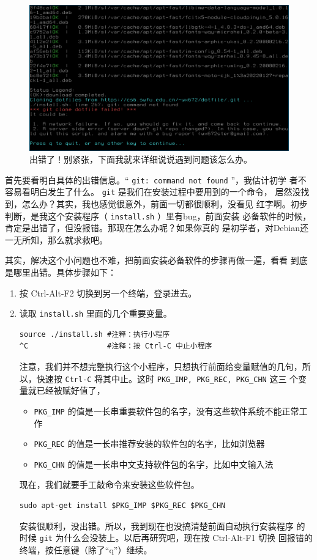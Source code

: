 \documentclass{wx672ctexart} \usepackage{hyperref}
\begin{document}
\begin{enumerate}
\begin{figure}[htbp]
\centering
\includegraphics[width=.5\linewidth]{screenshots/45.png}
\caption{出错了！别紧张，下面我就来详细说说遇到问题该怎么办。}
\end{figure}

首先要看明白具体的出错信息。“ \texttt{git: command not found} ”，我估计初学
者不容易看明白发生了什么。 \texttt{git} 是我们在安装过程中要用到的一个命令，
居然没找到，怎么办？其实，我也感觉很意外，前面一切都很顺利，没看见
红字啊。初步判断，是我这个安装程序（ \texttt{install.sh} ）里有bug，前面安装
必备软件的时候，肯定是出错了，但没报错。那现在怎么办呢？如果你真的
是初学者，对Debian还一无所知，那么就求救吧。

其实，解决这个小问题也不难，把前面安装必备软件的步骤再做一遍，看看
到底是哪里出错。具体步骤如下：

\begin{enumerate}
\item 按 Ctrl-Alt-F2 切换到另一个终端，登录进去。
\item 读取 \texttt{install.sh} 里面的几个重要变量。
\begin{verbatim}
source ./install.sh #注释：执行小程序
^C                  #注释：按 Ctrl-C 中止小程序
\end{verbatim}
注意，我们并不想完整执行这个小程序，只想执行前面给变量赋值的几句，所
以，快速按 \texttt{Ctrl-C} 将其中止。这时 \texttt{PKG\_IMP, PKG\_REC, PKG\_CHN} 这三
个变量就已经被赋好值了，
\begin{itemize}
\item \texttt{PKG\_IMP} 的值是一长串重要软件包的名字，没有这些软件系统不能正常工作
\item \texttt{PKG\_REC} 的值是一长串推荐安装的软件包的名字，比如浏览器
\item \texttt{PKG\_CHN} 的值是一长串中文支持软件包的名字，比如中文输入法
\end{itemize}

现在，我们就要手工敲命令来安装这些软件包。
\begin{verbatim}
sudo apt-get install $PKG_IMP $PKG_REC $PKG_CHN
\end{verbatim}
安装很顺利，没出错。所以，我到现在也没搞清楚前面自动执行安装程序
的时候 \texttt{git} 为什么会没装上。以后再研究吧，现在按 Ctrl-Alt-F1 切换
回报错的终端，按任意键（除了“q”）继续。


\end{enumerate}
\end{enumerate}
\end{document}
